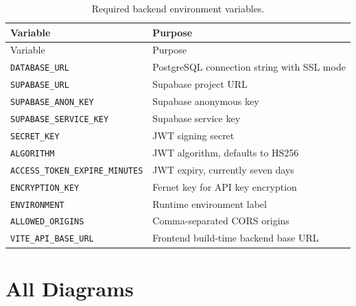 \documentclass[12pt,a4paper]{report}
\begin{document}
\begin{longtable}{p{}p{}}
\caption{Required backend environment variables.}\\
\toprule
Variable & Purpose \\
\midrule
\endfirsthead
\toprule
Variable & Purpose \\
\midrule
\endhead
\texttt{DATABASE\_URL} & PostgreSQL connection string with SSL mode \\
\texttt{SUPABASE\_URL} & Supabase project URL \\
\texttt{SUPABASE\_ANON\_KEY} & Supabase anonymous key \\
\texttt{SUPABASE\_SERVICE\_KEY} & Supabase service key \\
\texttt{SECRET\_KEY} & JWT signing secret \\
\texttt{ALGORITHM} & JWT algorithm, defaults to HS256 \\
\texttt{ACCESS\_TOKEN\_EXPIRE\_MINUTES} & JWT expiry, currently seven days \\
\texttt{ENCRYPTION\_KEY} & Fernet key for API key encryption \\
\texttt{ENVIRONMENT} & Runtime environment label \\
\texttt{ALLOWED\_ORIGINS} & Comma-separated CORS origins \\
\texttt{VITE\_API\_BASE\_URL} & Frontend build-time backend base URL \\
\bottomrule
\end{longtable}

\chapter{All Diagrams}
\end{document}
